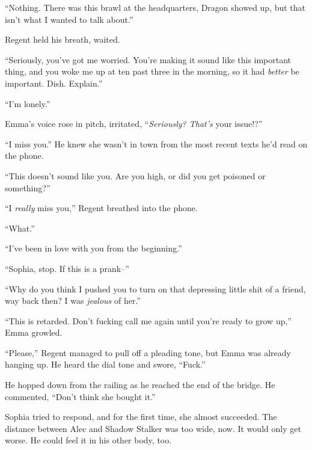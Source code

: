 ``Nothing.  There was this brawl at the headquarters, Dragon showed up, but that isn't what I wanted to talk about.''



Regent held his breath, waited.



``Seriously, you've got me worried.  You're making it sound like this important thing, and you woke me up at ten past three in the morning, so it had \emph{better} be important.  Dish.  Explain.''



``I'm lonely.''



Emma's voice rose in pitch, irritated, ``\emph{Seriously? That's} your issue!?''



``I miss you.''  He knew she wasn't in town from the most recent texts he'd read on the phone.



``This doesn't sound like you.  Are you high, or did you get poisoned or something?''



``I \emph{really} miss you,'' Regent breathed into the phone.



``What.''



``I've been in love with you from the beginning.''



``Sophia, stop.  If this is a prank--''



``Why do you think I pushed you to turn on that depressing little shit of a friend, way back then?  I was \emph{jealous} of her.''



``This is retarded.  Don't fucking call me again until you're ready to grow up,'' Emma growled.



``Please,'' Regent managed to pull off a pleading tone, but Emma was already hanging up.  He heard the dial tone and swore, ``Fuck.''



He hopped down from the railing as he reached the end of the bridge.  He commented,  ``Don't think she bought it.''



Sophia tried to respond, and for the first time, she almost succeeded.  The distance between Alec and Shadow Stalker was too wide, now.  It would only get worse.  He could feel it in his other body, too.



